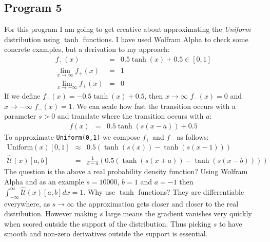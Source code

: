 \documentclass[]{article}
\begin{document}
\subsection{Program 5}
For this program I am going to get creative about approximating the \emph{Uniform} distribution using $\tanh$ functions. I have used Wolfram Alpha to check some concrete examples, but a derivation to my approach:
\begin{equation}\begin{array}{rcl}
 f_{+}(x) &=& 0.5\tanh(x) + 0.5 \in [0,1] \\
 \lim_{x\rightarrow \infty} f_{+}(x) &=& 1 \\
 \lim_{x\rightarrow -\infty} f_{+}(x) &=& 0
\end{array}\end{equation}
If we define $f_{-}(x) = -0.5\tanh(x) + 0.5$, then $x\rightarrow \infty$ $f_{-}(x) =0$ and $x\rightarrow -\infty$ $f_{-}(x) = 1$. We can scale how fast the transition occurs with a parameter $s>0$ and translate where the transition occurs with $a$:
\begin{equation}\begin{array}{rcl}
 f(x) &=& 0.5\tanh(s(x-a)) + 0.5
\end{array}
\end{equation}
To approximate \texttt{Uniform(0,1)} we compose $f_{+}$ and $f_{-}$ as follows:
\begin{equation}\begin{array}{rcl}
\text{Uniform}(x)[0,1] &\approx& 0.5\left(\tanh(s(x)) - \tanh(s(x-1))\right)\\
\hat{\mathcal{U}}(x)[a,b] &=& \frac{1}{b-a}\left(0.5\left(\tanh(s(x+a)) - \tanh(s(x-b))\right)\right)
\end{array}\end{equation}
The question is the above a real probability density function? Using Wolfram Alpha and as an example $s = 10000$, $b = 1$ and $a = -1$ then $\int_{-\infty}^{\infty}\hat{\mathcal{U}}(x)[a,b]dx = 1$. Why use $\tanh$ functions? They are differentiable everywhere, as $s\rightarrow \infty$ the approximation gets closer and closer to the real distribution. However making $s$ large means the gradient vanishes very quickly when scored outside the support of the distribution. Thus picking $s$ to have smooth and non-zero derivatives outside the support is essential.
\end{document}
